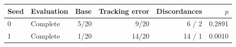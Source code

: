 \begin{tabular}{llrrrr}
\toprule
Seed & Evaluation & Base & Tracking error & Discordances & $p$ \\
\midrule
0 & Complete & 5/20 & 9/20 & 6 / 2 & 0.2891 \\
1 & Complete & 1/20 & 14/20 & 14 / 1 & 0.0010 \\
\bottomrule
\end{tabular}

